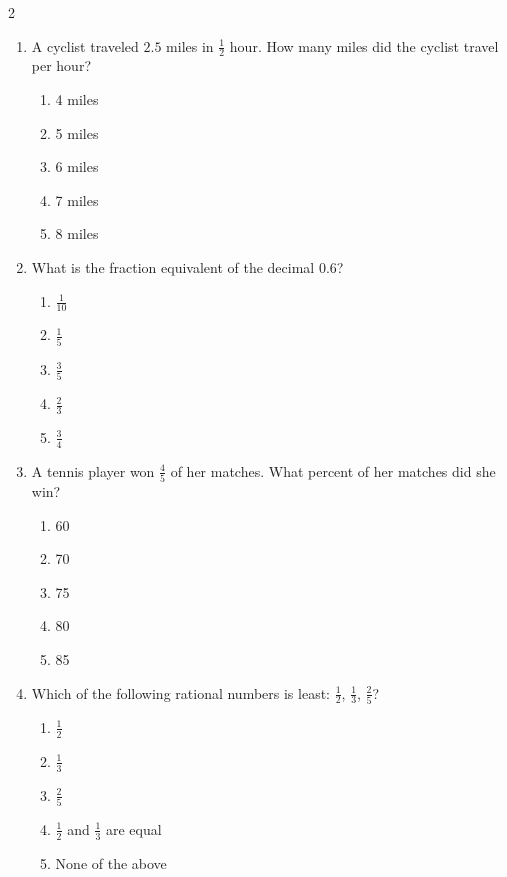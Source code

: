 \documentclass[10pt]{article}
\begin{document}
\begin{multicols}{2}
\begin{enumerate}[label=\textbf{Q\arabic*.}, leftmargin=*, itemsep=6pt, parsep=0pt]
  \item \small A cyclist traveled $2.5$ miles in $\frac{1}{2}$ hour. How many miles did the cyclist travel per hour?
  \begin{enumerate}[label=(\Alph*), leftmargin=0.6cm, nosep, itemsep=2pt]
    \item 4 miles
    \item 5 miles
    \item 6 miles
    \item 7 miles
    \item 8 miles
  \end{enumerate}

  \item \small What is the fraction equivalent of the decimal $0.6$?
  \begin{enumerate}[label=(\Alph*), leftmargin=0.6cm, nosep, itemsep=2pt]
    \item $\frac{1}{10}$
    \item $\frac{1}{5}$
    \item $\frac{3}{5}$
    \item $\frac{2}{3}$
    \item $\frac{3}{4}$
  \end{enumerate}

  \item \small A tennis player won $\frac{4}{5}$ of her matches. What percent of her matches did she win?
  \begin{enumerate}[label=(\Alph*), leftmargin=0.6cm, nosep, itemsep=2pt]
    \item 60%
    \item 70%
    \item 75%
    \item 80%
    \item 85%
  \end{enumerate}

  \item \small Which of the following rational numbers is least: $\frac{1}{2}$, $\frac{1}{3}$, $\frac{2}{5}$?
  \begin{enumerate}[label=(\Alph*), leftmargin=0.6cm, nosep, itemsep=2pt]
    \item $\frac{1}{2}$
    \item $\frac{1}{3}$
    \item $\frac{2}{5}$
    \item $\frac{1}{2}$ and $\frac{1}{3}$ are equal
    \item None of the above
  \end{enumerate}


\end{enumerate}
\end{multicols}
\end{document}
